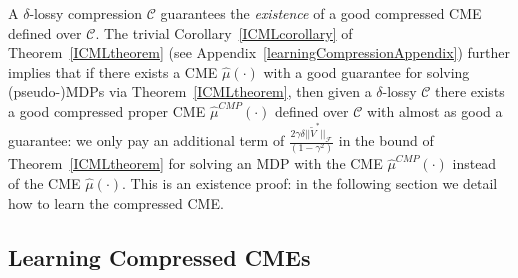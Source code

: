\documentclass[letterpaper]{article}
\newcommand{\cC}{{\mathcal C}}
\newcommand{\cF}{{\mathcal F}}
\begin{document}
A $\delta$-lossy compression $\cC$ guarantees the \emph{existence} of a good compressed CME defined over $\cC$. The trivial Corollary~\ref{ICMLcorollary} of Theorem~\ref{ICMLtheorem} (see Appendix~\ref{learningCompressionAppendix}) further implies that if there exists a CME $\hat\mu(\cdot)$ with a good guarantee for solving (pseudo-)MDPs via Theorem~\ref{ICMLtheorem}, then given a $\delta$-lossy $\cC$ there exists a good compressed proper CME $\hat\mu^{CMP}(\cdot)$ defined over $\cC$ with almost as good a guarantee: we only pay an additional term of $\frac{2\gamma \delta||\tilde V^*||_{\cF}}{(1-\gamma^2)}$ in the bound of Theorem~\ref{ICMLtheorem} for solving an MDP with the CME $\hat\mu^{CMP}(\cdot)$ instead of the CME $\hat\mu(\cdot)$. This is an existence proof: in the following section we detail how to learn the compressed CME.

\subsection{Learning Compressed CMEs} \label{LearningCompressedModel}
\end{document}
